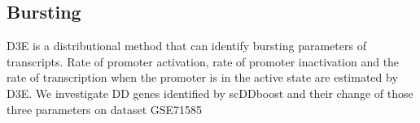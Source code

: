 \documentclass[aoas,preprint]{imsart}
\begin{document}
\subsection{Bursting}

D3E\citep{ref:d3e} is a distributional method that can identify bursting parameters of transcripts. Rate of promoter activation, rate of promoter inactivation and the rate of transcription when the promoter is in the active state are estimated by D3E.  We investigate DD genes identified by scDDboost and their change of those three parameters on dataset GSE71585\\

\end{document}
